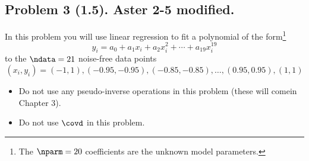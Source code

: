 \documentclass[11pt,titlepage,fleqn]{article}
\begin{document}

\subsection*{Problem 3 (1.5). Aster 2-5 modified.}

In this problem you will use linear regression to fit a polynomial of the form\footnote{The $\nparm = 20$ coefficients are the unknown model parameters.}
%
\begin{equation}
y_i = a_0 + a_1x_i + a_2x_i^2 + \cdots + a_{19}x_i^{19}
\label{yi}
\end{equation}
%
to the $\ndata=21$ noise-free data points
%
\begin{equation*}
(x_i,y_i) = (-1,1), (-0.95,-0.95), (-0.85,-0.85), \ldots, (0.95,0.95), (1,1)
\end{equation*}
%
\begin{itemize}
\item Do not use any pseudo-inverse operations in this problem (these will comein Chapter 3).

\item Do not use $\covd$ in this problem.
\end{itemize}

\end{document}
